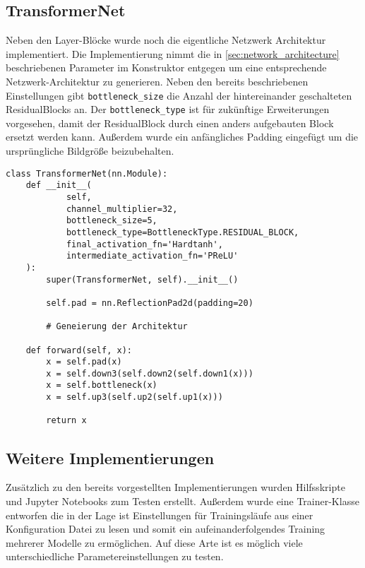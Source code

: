 \pagebreak

\subsection{TransformerNet}

Neben den Layer-Blöcke wurde noch die eigentliche Netzwerk Architektur implementiert. Die Implementierung nimmt die in \ref{sec:network_architecture} beschriebenen Parameter im Konstruktor entgegen um eine entsprechende Netzwerk-Architektur zu generieren. Neben den bereits beschriebenen Einstellungen gibt \texttt{bottleneck_size} die Anzahl der hintereinander geschalteten ResidualBlocks an. Der \texttt{bottleneck_type} ist für zukünftige Erweiterungen vorgesehen, damit der ResidualBlock durch einen anders aufgebauten Block ersetzt werden kann. Außerdem wurde ein anfängliches Padding eingefügt um die ursprüngliche Bildgröße beizubehalten.

\begin{listing}[H]
\begin{verbatim}
class TransformerNet(nn.Module):
    def __init__(
            self,
            channel_multiplier=32,
            bottleneck_size=5,
            bottleneck_type=BottleneckType.RESIDUAL_BLOCK,
            final_activation_fn='Hardtanh',
            intermediate_activation_fn='PReLU'
    ):
        super(TransformerNet, self).__init__()

        self.pad = nn.ReflectionPad2d(padding=20)

        # Geneierung der Architektur

    def forward(self, x):
        x = self.pad(x)
        x = self.down3(self.down2(self.down1(x)))
        x = self.bottleneck(x)
        x = self.up3(self.up2(self.up1(x)))

        return x
\end{verbatim}
\end{listing}

\pagebreak

\subsection{Weitere Implementierungen}

Zusätzlich zu den bereits vorgestellten Implementierungen wurden Hilfsskripte und Jupyter Notebooks zum Testen erstellt.
Außerdem wurde eine Trainer-Klasse entworfen die in der Lage ist Einstellungen für Trainingsläufe aus einer Konfiguration Datei zu lesen und somit 
ein aufeinanderfolgendes Training mehrerer Modelle zu ermöglichen. Auf diese Arte ist es möglich viele unterschiedliche Parametereinstellungen zu testen.

